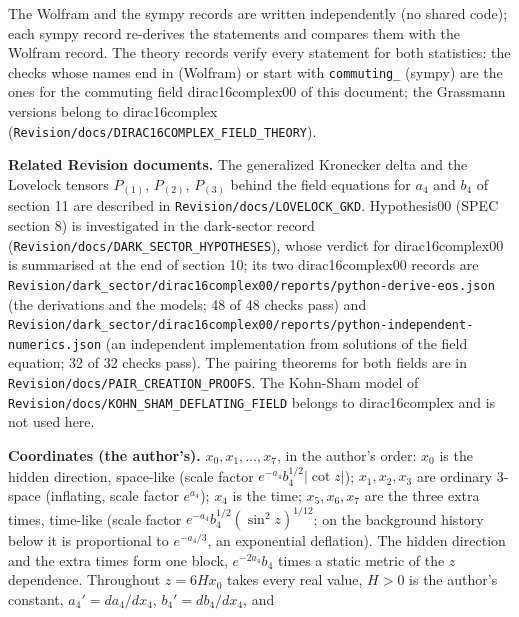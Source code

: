 \documentclass[11pt]{article}
\begin{document}
The Wolfram and the sympy records are written independently (no shared code); each sympy record re-derives the statements and compares them with the Wolfram record. The theory records verify every statement for both statistics: the checks whose names end in \texttt{} (Wolfram) or start with \texttt{commutin\allowbreak{}g\_} (sympy) are the ones for the commuting field dirac16complex00 of this document; the Grassmann versions belong to dirac16complex (\texttt{Revision\allowbreak{}/docs/DI\allowbreak{}RAC16COM\allowbreak{}PLEX\_FIE\allowbreak{}LD\_THEOR\allowbreak{}Y}).

\textbf{Related Revision documents.} The generalized Kronecker delta and the Lovelock tensors $P_{(1)}$, $P_{(2)}$, $P_{(3)}$ behind the field equations for $a_4$ and $b_4$ of section 11 are described in \texttt{Revision\allowbreak{}/docs/LO\allowbreak{}VELOCK\_G\allowbreak{}KD}. Hypothesis00 (SPEC section 8) is investigated in the dark-sector record (\texttt{Revision\allowbreak{}/docs/DA\allowbreak{}RK\_SECTO\allowbreak{}R\_HYPOTH\allowbreak{}ESES}), whose verdict for dirac16complex00 is summarised at the end of section 10; its two dirac16complex00 records are \texttt{Revision\allowbreak{}/dark\_se\allowbreak{}ctor/dir\allowbreak{}ac16comp\allowbreak{}lex00/re\allowbreak{}ports/py\allowbreak{}thon-der\allowbreak{}ive-eos.\allowbreak{}json} (the derivations and the models; 48 of 48 checks pass) and \texttt{Revision\allowbreak{}/dark\_se\allowbreak{}ctor/dir\allowbreak{}ac16comp\allowbreak{}lex00/re\allowbreak{}ports/py\allowbreak{}thon-ind\allowbreak{}ependent\allowbreak{}-numeric\allowbreak{}s.json} (an independent implementation from solutions of the field equation; 32 of 32 checks pass). The pairing theorems for both fields are in \texttt{Revision\allowbreak{}/docs/PA\allowbreak{}IR\_CREAT\allowbreak{}ION\_PROO\allowbreak{}FS}. The Kohn-Sham model of \texttt{Revision\allowbreak{}/docs/KO\allowbreak{}HN\_SHAM\_\allowbreak{}DEFLATIN\allowbreak{}G\_FIELD} belongs to dirac16complex and is not used here.

\textbf{Coordinates (the author's).} $x_0, x_1, \dots, x_7$, in the author's order: $x_0$ is the hidden direction, space-like (scale factor $e^{-a_4}b_4^{1/2}\lvert\cot z\rvert$); $x_1, x_2, x_3$ are ordinary 3-space (inflating, scale factor $e^{a_4}$); $x_4$ is the time; $x_5, x_6, x_7$ are the three extra times, time-like (scale factor $e^{-a_4}b_4^{1/2}(\sin^2 z)^{1/12}$; on the background history below it is proportional to $e^{-a_4/3}$, an exponential deflation). The hidden direction and the extra times form one block, $e^{-2a_4}b_4$ times a static metric of the $z$ dependence. Throughout $z = 6Hx_0$ takes every real value, $H > 0$ is the author's constant, $a_4' = da_4/dx_4$, $b_4' = db_4/dx_4$, and
\end{document}
